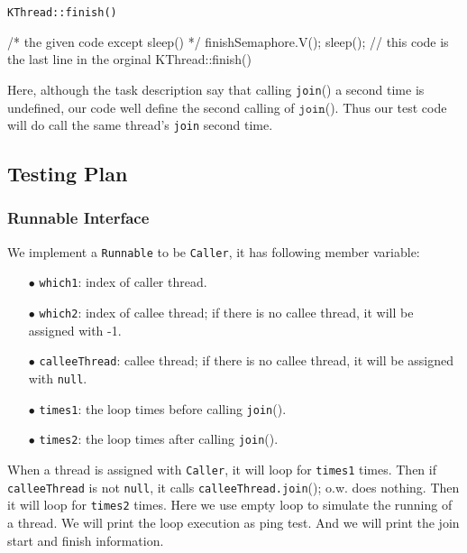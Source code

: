 \documentclass{article}
\begin{document}
\begin{spacing}{1.1}
\begin{algorithm}[htbp]
  \caption{\texttt{KThread::finish()}}
  \begin{algorithmic}[1]
    \STATE /* the given code except sleep() */
    \STATE finishSemaphore.V();
    \STATE sleep(); // this code is the last line in the orginal KThread::finish()
  \end{algorithmic}
\end{algorithm}
{\color{red}Here, although the task description say that calling \texttt{join}() a second time is undefined, 
our code well define the second calling of $\texttt{join}$(). Thus our test code will do call the same thread's
\texttt{join} second time.}

\subsection{Testing Plan}
\subsubsection{Runnable Interface}
We implement a \texttt{Runnable} to be \texttt{Caller}, it has following member variable:
\begin{enumerate}
  \item[$\bullet$] \texttt{which1}: index of caller thread.
  \item[$\bullet$] \texttt{which2}: index of callee thread; if there is no callee thread,
    it will be assigned with -1.
  \item[$\bullet$] \texttt{calleeThread}: callee thread; if there is no callee thread, it 
    will be assigned with \texttt{null}.
  \item[$\bullet$] \texttt{times1}: the loop times before calling \texttt{join}().
  \item[$\bullet$] \texttt{times2}: the loop times after calling \texttt{join}().
\end{enumerate}
When a thread is assigned with \texttt{Caller}, it will loop for \texttt{times1} times. Then if
\texttt{calleeThread} is not \texttt{null}, it calls \texttt{calleeThread.join}(); o.w. does nothing.
Then it will loop for \texttt{times2} times. Here we use empty loop to simulate the running of a thread.
We will print the loop execution as ping test. And we will print the join start and finish information.

\end{spacing}
\end{document}
